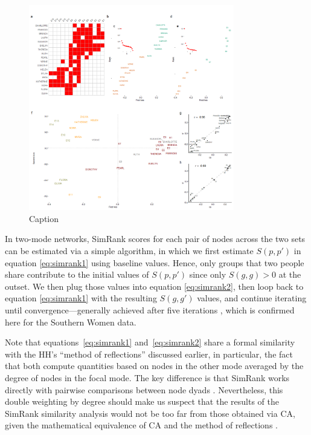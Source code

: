 \documentclass[a4paper,fleqn]{cas-sc}
\begin{document}
\begin{figure}
    \centering
    \includegraphics[width=0.8\textwidth]{Plots/sr-plot.png}
    \caption{Caption}
    \label{fig:simrank}
\end{figure}

In two-mode networks, SimRank scores for each pair of nodes across the two sets can be estimated via a simple algorithm, in which we first estimate $S(p, p')$ in equation \ref{eq:simrank1} using baseline values. Hence, only groups that two people share contribute to the initial values of $S(p, p')$ since only $S(g, g)>0$ at the outset. We then plug those values into equation \ref{eq:simrank2}, then loop back to equation \ref{eq:simrank1} with the resulting $S(g, g')$ values, and continue iterating until convergence---generally achieved after five iterations \citep{jeh2002simrank}, which is confirmed here for the Southern Women data. 

Note that equations~\ref{eq:simrank1} and~\ref{eq:simrank2} share a formal similarity with the HH's ``method of reflections'' discussed earlier, in particular, the fact that both compute quantities based on nodes in the other mode averaged by the degree of nodes in the focal mode. The key difference is that SimRank works directly with pairwise comparisons between node dyads \citep{jeh2002simrank}. Nevertheless, this double weighting by degree should make us suspect that the results of the SimRank similarity analysis would not be too far from those obtained via CA, given the mathematical equivalence of CA and the method of reflections \citep{mealy2019interpreting, van2021correspondence}.
\end{document}
